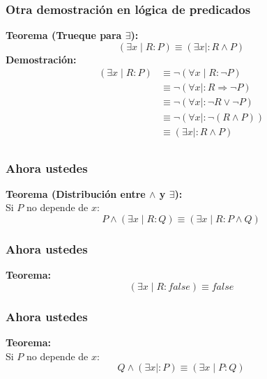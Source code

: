 \documentclass{beamer}
\newcommand{\then}{\Rightarrow}
\begin{document}
\begin{frame}[fragile]
    \frametitle{Otra demostración en lógica de predicados}
    \pause
    \textbf{Teorema (Trueque para $\exists$):}
    $$(\exists x \mid R : P) \equiv (\exists x \mid : R \land P)$$
    \pause
    \textbf{Demostración:} \\
    \pause
    \begin{align*}
        (\exists x \mid R : P) &\equiv \lnot (\forall x \mid R : \lnot P) \tag{De Morgan gen.}\\ 
        &\equiv \lnot (\forall x \mid : R \then \lnot P) \tag{trueque para $\forall$}\\
        &\equiv \lnot (\forall x \mid : \lnot R \lor \lnot P) \tag{definición $\then$}\\
        &\equiv \lnot (\forall x \mid : \lnot (R \land P)) \tag{De Morgan }\\
        &\equiv (\exists x \mid : R \land P) \tag{De Morgan gen.}\\
    \end{align*}
\end{frame}

\begin{frame}[fragile]
    \frametitle{Ahora ustedes}
    \pause
    \textbf{Teorema (Distribución entre $\land$ y $\exists$):} \\
    Si $P$ no depende de $x$:
    $$P \land (\exists x \mid R : Q) \equiv (\exists x \mid R : P \land Q)$$
    \vspace*{165 pt}
\end{frame}

\begin{frame}[fragile]
    \frametitle{Ahora ustedes}
    \pause
    \textbf{Teorema:} \\
    $$(\exists x \mid R : false) \equiv false$$
    \vspace*{165 pt}
\end{frame}

\begin{frame}[fragile]
    \frametitle{Ahora ustedes}
    \pause
    \textbf{Teorema:} \\
    Si $P$ no depende de $x$:
    $$Q \land (\exists x \mid : P) \equiv (\exists x \mid P : Q)$$
    \vspace*{165 pt}
\end{frame}
\end{document}
